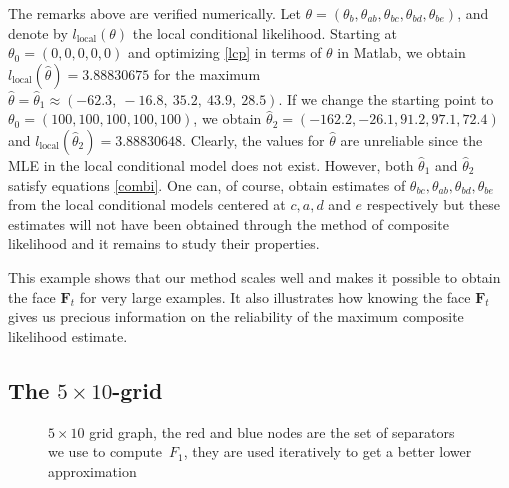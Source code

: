 \documentclass[aos,noinfoline]{imsart}
\def\i{\underline i}
\newcommand{\Fbf}{\mathbf{F}}
\theoremstyle{remark}
\theoremstyle{definition}
\newcommand{\griddefinenodes}[2]{%
  \foreach \j in {1,...,#2} \foreach \i in {1,...,#1} {
    \path (\j,-\i) coordinate (X\i\j);}}
\newcommand{\griddrawedges}[2]{%
  \foreach \i in {1,...,#1} \foreach \j [count=\jj] in {2,...,#2} { \draw (X\i\jj) -- (X\i\j);}
  \foreach \j in {1,...,#2} \foreach \i [count=\ii] in {2,...,#1} { \draw (X\ii\j) -- (X\i\j);}}
\newcommand{\gridaddlabels}[3][1]{%
  \foreach \j in {1,...,#3} {
    \node[label=above:{\pgfmathparse{#2*(\j-1)+#1}\pgfmathprintnumber{\pgfmathresult}}] at (X1\j) {};
    \node[label=below:{\pgfmathparse{#2*\j-1+#1}\pgfmathprintnumber{\pgfmathresult}}] at (X#2\j) {}; }}
\begin{document}
The remarks above are verified numerically. Let $\theta=(\theta_b, \theta_{ab}, \theta_{bc},\theta_{bd},\theta_{be})$, and denote by $l_{\text{local}}(\theta)$ the local conditional likelihood.
  Starting at $\theta_0=(0,0,0,0,0)$  and optimizing \eqref{lcp} in terms of $\theta$ in Matlab, we obtain $l_{\text{local}}(\hat{\theta})=3.88830675$ %
  for the maximum %
  $\hat{\theta}=\hat{\theta}_1\approx(-62.3 ,\  -16.8 ,\    35.2,\   43.9 ,\   28.5)$.  If we change the starting point to $\theta_0=(100,100,100,100,100)$, we obtain $\hat{\theta}_2=(-162.2, -26.1, 91.2,  97.1,  72.4)$ and $l_{\text{local}}(\hat{\theta}_2)=3.88830648$. %
  Clearly, the values for $\hat{\theta}$ are unreliable since the MLE in the local conditional model does not exist. However, both $\hat{\theta}_1$ and $\hat{\theta}_2$ satisfy equations \eqref{combi}.
  One can, of course, obtain estimates of $\theta_{bc}, \theta_{ab}, \theta_{bd},\theta_{be}$ from the local conditional models centered at $c,a,d$ and $e$ respectively but these estimates will not have been obtained through the method of composite likelihood and it remains to study their properties.
  
  
This example shows that our method scales well and makes it possible to obtain the face $\Fbf_t$ for very large examples.  It also illustrates how knowing the face $\Fbf_t$ gives us precious information on the reliability of the maximum composite likelihood estimate.
 


\subsection{The \texorpdfstring{$5\times10$}{5x10}-grid}
\label{sec:5x10}

\begin{figure} %
  \centering
  \caption{$5 \times 10$ grid graph, the red and blue nodes are the set of separators we use to compute~$F_1$, they are used iteratively to get a better lower approximation}
  \label{5by10}
\end{figure}
\end{document}

